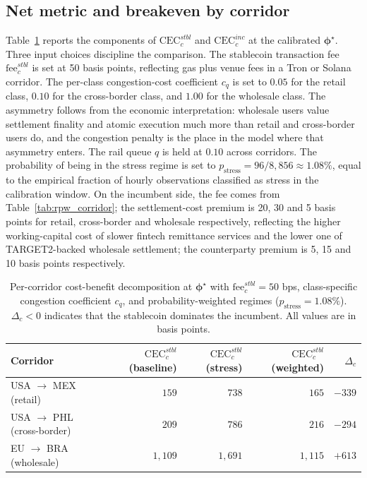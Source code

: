 \subsection{Net metric and breakeven by corridor}\label{sub:cb_by_corridor}

Table~\ref{tab:cb_corridor} reports the components of $\mathrm{CEC}^{stbl}_c$ and $\mathrm{CEC}^{inc}_c$ at the calibrated $\boldsymbol{\phi}^\star$. Three input choices discipline the comparison. The stablecoin transaction fee $\mathrm{fee}_c^{stbl}$ is set at 50 basis points, reflecting gas plus venue fees in a Tron or Solana corridor. The per-class congestion-cost coefficient $c_q$ is set to $0.05$ for the retail class, $0.10$ for the cross-border class, and $1.00$ for the wholesale class. The asymmetry follows from the economic interpretation: wholesale users value settlement finality and atomic execution much more than retail and cross-border users do, and the congestion penalty is the place in the model where that asymmetry enters. The rail queue $q$ is held at $0.10$ across corridors. The probability of being in the stress regime is set to $p_{\text{stress}} = 96/8{,}856 \approx 1.08\%$, equal to the empirical fraction of hourly observations classified as stress in the calibration window. On the incumbent side, the fee comes from Table~\ref{tab:rpw_corridor}; the settlement-cost premium is 20, 30 and 5 basis points for retail, cross-border and wholesale respectively, reflecting the higher working-capital cost of slower fintech remittance services and the lower one of TARGET2-backed wholesale settlement; the counterparty premium is 5, 15 and 10 basis points respectively.

\begin{table}[h]
\centering
\caption{Per-corridor cost-benefit decomposition at $\boldsymbol{\phi}^\star$ with $\mathrm{fee}_c^{stbl} = 50$ bps, class-specific congestion coefficient $c_q$, and probability-weighted regimes ($p_{\text{stress}} = 1.08\%$). $\Delta_c < 0$ indicates that the stablecoin dominates the incumbent. All values are in basis points.}
\label{tab:cb_corridor}
\begin{tabular}{lrrrr}
\toprule
Corridor & $\mathrm{CEC}^{stbl}_c$ (baseline) & $\mathrm{CEC}^{stbl}_c$ (stress) & $\mathrm{CEC}^{stbl}_c$ (weighted) & $\Delta_c$ \\
\midrule
USA $\to$ MEX (retail) & $159$ & $738$ & $165$ & $-339$ \\
USA $\to$ PHL (cross-border) & $209$ & $786$ & $216$ & $-294$ \\
EU $\to$ BRA (wholesale) & $1{,}109$ & $1{,}691$ & $1{,}115$ & $+613$ \\
\bottomrule
\end{tabular}
\end{table}

